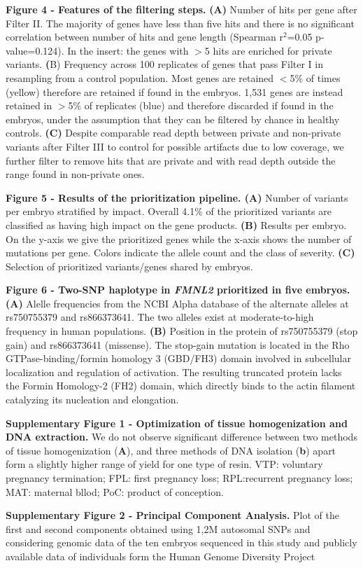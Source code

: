 \textbf{Figure 4 - Features of the filtering steps.} \textbf{(A)} Number of hits per gene after Filter II. The majority of genes have less than five hits and there is no significant correlation between number of hits and gene length (Spearman r$^2$=0.05 p-value=0.124). In the insert: the genes with $>$5 hits are enriched for private variants. \textbf(B) Frequency across 100 replicates of genes that pass Filter I in resampling from a control population. Most genes are retained $<$5\% of times (yellow) therefore are retained if found in the embryos. 1,531 genes are instead retained in $>$5\% of replicates (blue) and therefore discarded if found in the embryos, under the assumption that they can be filtered by chance in healthy controls. \textbf{(C)} Despite comparable read depth between private and non-private variants after Filter III to control for possible artifacts due to low coverage, we further filter to remove hits that are private and with read depth outside the range found in non-private ones.

\textbf{Figure 5 - Results of the prioritization pipeline. (A)} Number of variants per embryo stratified by impact. Overall 4.1\% of the prioritized variants are classified as having high impact on the gene products. \textbf{(B)} Results per embryo. On the y-axis we give the prioritized genes while the x-axis shows the number of mutations per gene. Colors indicate the allele count and the class of severity. \textbf{(C)} Selection of prioritized variants/genes shared by embryos.


\textbf{Figure 6 - Two-SNP haplotype in \textit{FMNL2} prioritized in five embryos. (A)} Alelle frequencies from the NCBI Alpha database of the alternate alleles at rs750755379 and rs866373641. The two alleles exist at moderate-to-high frequency in human populations. \textbf{(B)} Position in the protein of rs750755379 (stop gain) and rs866373641 (missense). The stop-gain mutation is located in the Rho GTPase-binding/formin homology 3 (GBD/FH3) domain involved in subcellular localization and regulation of activation. The resulting truncated protein lacks the Formin Homology-2 (FH2) domain, which directly binds to the actin filament catalyzing its nucleation and elongation.

\textbf{Supplementary Figure 1 - Optimization of tissue homogenization and DNA extraction.} We do not observe significant difference between two methods of tissue homogenization (\textbf{A}), and three methods of DNA isolation (\textbf{b}) apart form a slightly higher range of yield for one type of resin. VTP: voluntary pregnancy termination;  FPL: first pregnancy loss; RPL:recurrent pregnancy loss;  MAT: maternal bllod; PoC: product of conception.


\textbf{Supplementary Figure 2 - Principal Component Analysis.} Plot of the first and second components obtained using 1,2M autosomal SNPs and considering genomic data of the ten embryos sequenced in this study and publicly available data of individuals form the Human Genome Diversity Project
